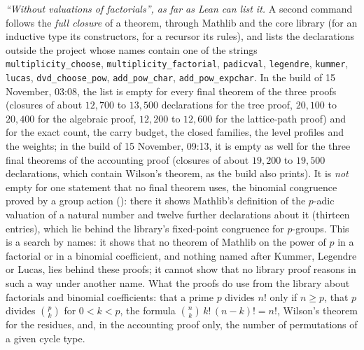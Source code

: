 \documentclass[11pt]{article}
\theoremstyle{definition}
\theoremstyle{remark}
\numberwithin{equation}{section}
\numberwithin{figure}{section}
\begin{document}
\emph{``Without valuations of factorials'', as far as Lean can list it.} A second command follows the
\emph{full closure} of a theorem, through Mathlib and the core library (for an inductive type its
constructors, for a recursor its rules), and lists the declarations outside the project whose names contain
one of the strings \texttt{multiplicity\_choose}, \texttt{multiplicity\_factorial}, \texttt{padicval},
\texttt{legendre}, \texttt{kummer}, \texttt{lucas}, \texttt{dvd\_choose\_pow}, \texttt{add\_pow\_char},
\texttt{add\_pow\_expchar}. In the build of 15 November, 03:08, the list is empty for every final theorem of
the three proofs (closures of about $12{,}700$ to $13{,}500$ declarations for the tree proof, $20{,}100$ to
$20{,}400$ for the algebraic proof, $12{,}200$ to $12{,}600$ for the lattice-path proof) and for the exact
count, the carry budget, the closed families, the level profiles and the weights; in the build of
15 November, 09:13, it is empty as well for the three final theorems of the accounting proof (closures of
about $19{,}200$ to $19{,}500$ declarations, which contain Wilson's theorem, as the build also prints). It is
\emph{not} empty for one statement that no final theorem uses, the binomial congruence proved by a group
action (): there it shows Mathlib's definition of the $p$-adic valuation
of a natural number and twelve further declarations about it (thirteen entries), which lie behind the library's fixed-point congruence
for $p$-groups. This is a search by names:
it shows that no theorem of Mathlib on the power of $p$ in a factorial or in a binomial coefficient, and
nothing named after Kummer, Legendre or Lucas, lies behind these proofs; it cannot show that no library proof
reasons in such a way under another name. What the proofs do use from the library about factorials and
binomial coefficients: that a prime $p$ divides $n!$ only if $n\ge p$, that $p$ divides $\binom pk$ for
$0<k<p$, the formula $\binom nk\,k!\,(n-k)!=n!$, Wilson's theorem for the residues, and, in the accounting
proof only, the number of permutations of a given cycle type.


\end{document}

